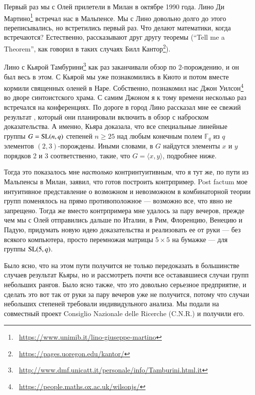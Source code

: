 \documentclass[intlimits,twoside,a4paper,11pt]{article}
\newcommand\SL{{\rm SL}}
\def\GF#1{{\mathbb F}_{\!#1}}
\begin{document}
	Первый раз мы с Олей прилетели в Милан в октябре 1990 года. Лино Ди 
	Мартино\footnote{~\url{https://www.unimib.it/lino-giuseppe-martino}} встречал нас в Мальпенсе. 
	Мы с Лино довольно долго до этого
	переписывались, но встретились первый раз. Что делают математики, когда встречаются? 
	Естественно, рассказывают друг другу теоремы (``Tell me a Theorem'', как говорил
	в таких случаях Билл Кантор\footnote{~\url{https://pages.uoregon.edu/kantor/}}).
	
	Лино с Кьярой Тамбурини\footnote{~\url{http://www.dmf.unicatt.it/personale/info/Tamburini.html.it}}
	как раз заканчивали обзор \cite{DT} по
	$2$-порождению, и он был весь в этом. С Кьярой мы уже познакомились в Киото 
	и потом вместе кормили священных оленей в Наре. 
	Собственно, познакомил нас Джон 
	Уилсон\footnote{~\url{https://people.maths.ox.ac.uk/wilsonjs/}}  во дворе синтоистского храма. 
	С самим Джоном я к тому времени несколько раз встречался на конференциях.
	По дороге в город Лино рассказал 
	мне ее свежий результат \cite{T}, который они планировали включить в обзор с 
	наброском доказательства.
	А именно, Кьяра доказала, что все специальные линейные группы $G=\SL(n,q)$ 
	степеней $n\ge 25$ над любым конечным полем $\GF{q}$ из $q$ элементов 
	$(2,3)$-порождены.
	Иными словами, в $G$ найдутся элементы $x$ и $y$ порядков 2 и 3 соответственно,
	такие, что $G=\langle x,y\rangle$, подробнее ниже.
	
	Тогда это показалось мне {\it настолько\/} контринтуитивным, что я тут же, по 
	пути из Мальпенсы в Милан,
	заявил, что готов построить контрпример. Post factum мое интуитивное представление 
	о возможном и невозможном в комбинаторной теории групп поменялось на прямо 
	противоположное --- возможно все, что явно не запрещено. Тогда же вместо 
	контрпримера мне удалось за пару вечеров, прежде чем мы с Олей отправились дальше 
	по Италии, в Рим, Флоренцию, Венецию и Падую, придумать новую идею доказательства 
	и реализовать ее от руки --- без всякого компьютера, просто перемножая матрицы
	$5\times 5$ на бумажке --- для группы $\SL(5,q)$. 
	
	Было ясно, что на этом пути получится не только передоказать в большинстве 
	случаев результат Кьяры, но и рассмотреть почти все остававшиеся случаи групп 
	небольших рангов. Было ясно также, что это довольно серьезное предприятие, и
	сделать это вот так от руки за пару вечеров уже не получится, потому что случаи 
	небольших степеней требовали индивидульного анализа.
	Мы подали на совместный проект Consiglio Nazionale delle Ricerche 
	(C.N.R.) и получили его. 
	
\end{document}
